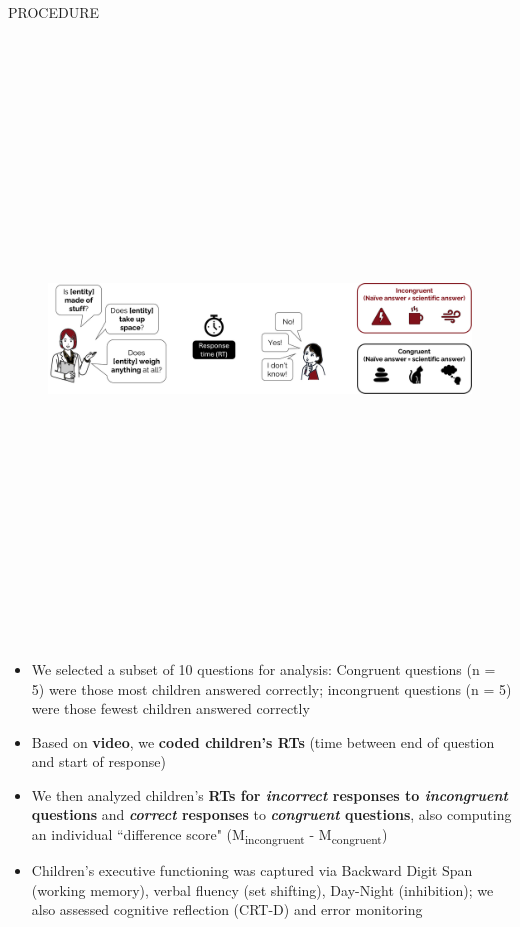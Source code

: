 \documentclass[final]{beamer}
\newlength{\colwidth}
\begin{document}
\begin{frame}[t]
\begin{columns}[t]
\begin{column}{\colwidth}
\begin{block}{PROCEDURE}
    \begin{figure}
      \centering
	{\includegraphics[height=16cm]{images/procedure7.png}}\\[2ex]
    \end{figure}

    \begin{itemize}
    	\item We selected a subset of 10 questions for analysis: Congruent questions (n = 5) were those most children answered correctly; incongruent questions (n = 5) were those fewest children answered correctly
	\item Based on \textbf{video}, we \textbf{coded children's RTs} (time between end of question and start of response)
	\item We then analyzed children's \textbf{RTs for \emph{incorrect} responses to \emph{incongruent} questions} and \textbf{\emph{correct} responses} to \textbf{\emph{congruent} questions}, also computing an individual “difference score" (M\textsubscript{incongruent} - M\textsubscript{congruent})
	\item Children's executive functioning was captured via Backward Digit Span (working memory), verbal fluency (set shifting), Day-Night (inhibition); we also assessed cognitive reflection (CRT-D) and error monitoring
    \end{itemize}
    

\end{block}
\end{column}
\end{columns}
\end{frame}
\end{document}
